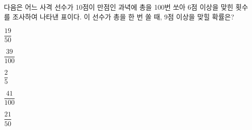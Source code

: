 다음은 어느 사격 선수가 10점이 만점인 과녁에 총을 100번 쏘아 6점 이상을 맞힌 횟수를 조사하여 나타낸 표이다. 이 선수가 총을 한 번 쏠 때, 9점 이상을 맞힐 확률은?\par\smallskip{}\par\smallskip\noindent
\begin{choicesii}{\rule[-3ex]{0pt}{8ex}$\dfrac{19}{50}$}{\rule[-3ex]{0pt}{8ex}$\dfrac{39}{100}$}{\rule[-3ex]{0pt}{8ex}$\dfrac{2}{5}$}{\rule[-3ex]{0pt}{8ex}$\dfrac{41}{100}$}{\rule[-3ex]{0pt}{8ex}$\dfrac{21}{50}$}\end{choicesii}

